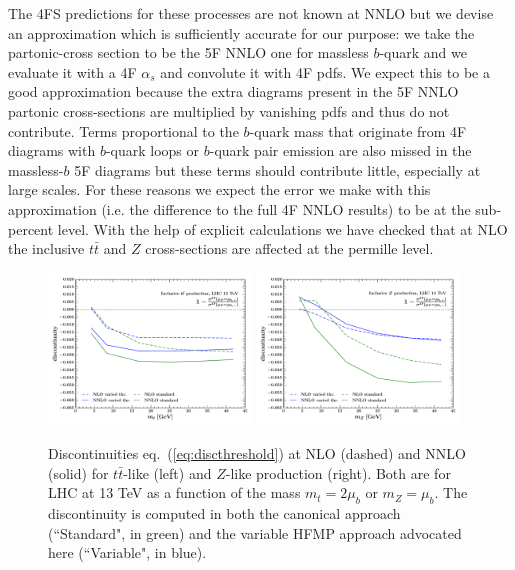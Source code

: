 \documentclass[letter,11pt]{article}
\def\t{{\bar t}}
\def\mub{\mu_b}
\begin{document}
The 4FS predictions for these processes are not known at NNLO but we devise an approximation which is sufficiently accurate for our purpose: we take the partonic-cross section to be the 5F NNLO one for massless $b$-quark and we evaluate it with a 4F $\alpha_s$ and convolute it with 4F pdfs. We expect this to be a good approximation because the extra diagrams present in the 5F NNLO partonic cross-sections are multiplied by vanishing pdfs and thus do not contribute. Terms proportional to the $b$-quark mass that originate from 4F diagrams with $b$-quark loops or $b$-quark pair emission are also missed in the massless-$b$ 5F diagrams but these terms should contribute little, especially at large scales. For these reasons we expect the error we make with this approximation (i.e. the difference to the full 4F NNLO results) to be at the sub-percent level. With the help of explicit calculations we have checked that at NLO the inclusive $t\bar{t}$ and $Z$ cross-sections are affected at the permille level.
%
\begin{figure}[t]
\centering
\includegraphics[trim=0.3cm 0.0cm 0.1cm 0.4cm,clip,width=0.48\textwidth]{./ttb_incl_5f4f_disc.pdf}
\includegraphics[trim=0.3cm 0.0cm 0.1cm 0.4cm,clip,width=0.48\textwidth]{./z_incl_5f4f_disc.pdf}\\ 
\caption{Discontinuities eq.~(\ref{eq:discthreshold}) at NLO (dashed) and NNLO (solid) for $t\t$-like (left) and $Z$-like production (right). Both are for LHC at 13 TeV as a function of the mass $m_t=2\mub$ or $m_Z=\mub$. The discontinuity is computed in both the canonical approach (``Standard", in green) and the variable HFMP approach advocated here (``Variable", in blue).}
\label{fig:discprecprocs}
\end{figure}
\end{document}
